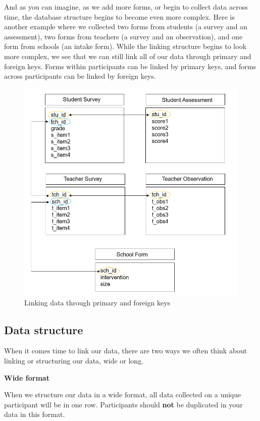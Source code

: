 \documentclass[
]{book}
\begin{document}
And as you can imagine, as we add more forms, or begin to collect data across time, the database structure begins to become even more complex. Here is another example where we collected two forms from students (a survey and an assessment), two forms from teachers (a survey and an observation), and one form from schools (an intake form). While the linking structure begins to look more complex, we see that we can still link all of our data through primary and foreign keys. Forms within participants can be linked by primary keys, and forms across participants can be linked by foreign keys.

\begin{figure}

{\centering \includegraphics[width=0.7\linewidth]{img/link2} 

}

\caption{Linking data through primary and foreign keys}\label{fig:unnamed-chunk-11}
\end{figure}

\hypertarget{structure}{%
\subsection{Data structure}\label{structure}}

When it comes time to link our data, there are two ways we often think about linking or structuring our data, wide or long.

\textbf{Wide format}

When we structure our data in a wide format, all data collected on a unique participant will be in one row. Participants should \textbf{not} be duplicated in your data in this format.
\end{document}
